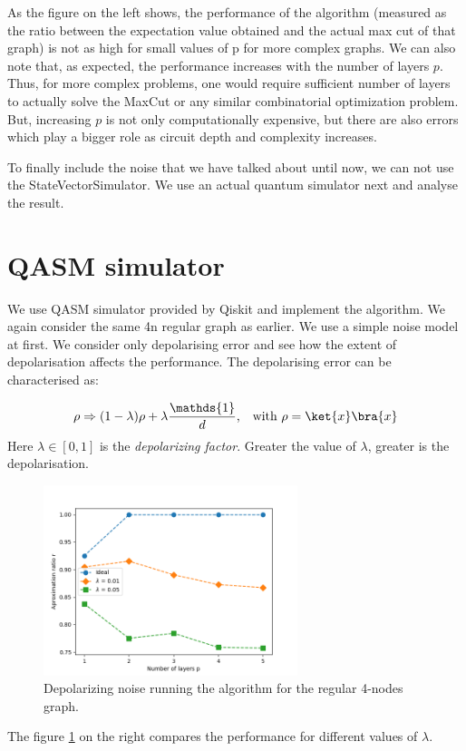 As the figure on the left shows, the performance of the algorithm (measured as the ratio between the expectation value obtained and the actual max cut of that graph) is not as high for small values of p for more complex graphs.
We can also note that, as expected, the performance increases with the number of layers $p$.\\
Thus, for more complex problems, one would require sufficient number of layers to actually solve the MaxCut or any similar combinatorial optimization problem.
But, increasing $p$ is not only computationally expensive, but there are also errors which play a bigger role as circuit depth and complexity increases.

To finally include the noise that we have talked about until now, we can not use the StateVectorSimulator.
We use an actual quantum simulator next and analyse the result.

\section{QASM simulator}
\label{qasm_section}
We use QASM simulator provided by Qiskit and implement the algorithm.
We again consider the same 4n regular graph as earlier.
We use a simple noise model at first. We consider only depolarising error and see how the extent of depolarisation affects the performance. The depolarising error can be characterised as:

\[
    \rho \Rightarrow (1-\lambda)\rho + \lambda \frac{\mathds{1}}{d}\text{,}\quad \text{with } \rho = \ket{x}\bra{x}
\]
Here $\lambda \in [0, 1]$ is the \emph{depolarizing factor}. Greater the value of $\lambda$, greater is the depolarisation.

 \begin{figure}
    \centering
    \includegraphics[width=0.66\textwidth]{images/depolarizing noise.png}
    \caption{Depolarizing noise running the algorithm for the regular 4-nodes graph.}
    \label{fig:dep_err_per}
\end{figure}
The figure \ref{fig:dep_err_per} on the right compares the performance for different values of $\lambda$.

